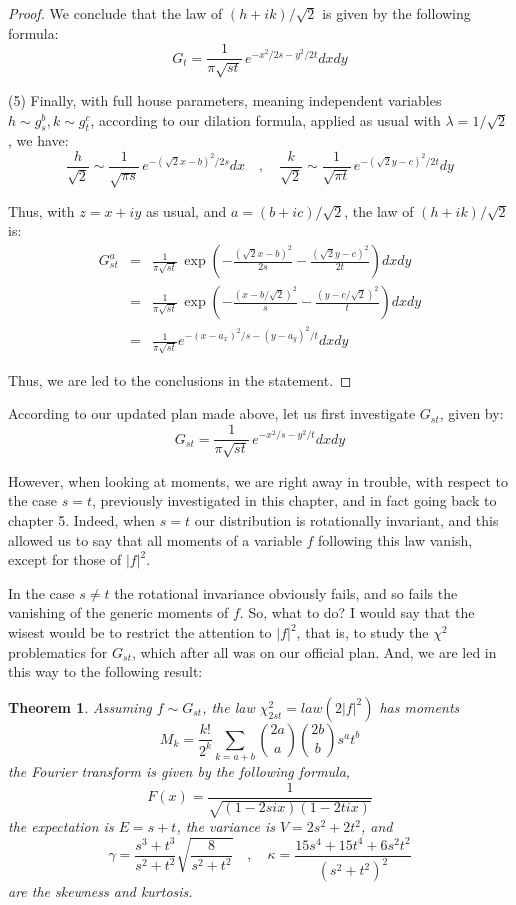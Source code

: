 \documentclass[12pt]{amsbook}
\newtheorem{theorem}{Theorem}[chapter]
\begin{document}
\begin{proof}
We conclude that the law of $(h+ik)/\sqrt{2}$ is given by the following formula:
$$G_t=\frac{1}{\pi\sqrt{st}}\,e^{-x^2/2s-y^2/2t}dxdy$$

(5) Finally, with full house parameters, meaning independent variables $h\sim g_s^b,k\sim g_t^c$, according to our dilation formula, applied as usual with $\lambda=1/\sqrt{2}$, we have:
$$\frac{h}{\sqrt{2}}\sim\frac{1}{\sqrt{\pi s}}\,e^{-(\sqrt{2}x-b)^2/2s}dx
\quad,\quad \frac{k}{\sqrt{2}}\sim\frac{1}{\sqrt{\pi t}}\,e^{-(\sqrt{2}y-c)^2/2t}dy$$

Thus, with $z=x+iy$ as usual, and $a=(b+ic)/\sqrt{2}$, the law of $(h+ik)/\sqrt{2}$ is:
\begin{eqnarray*}
G_{st}^a
&=&\frac{1}{\pi\sqrt{st}}\,\exp\left(-\frac{(\sqrt{2}x-b)^2}{2s}-\frac{(\sqrt{2}y-c)^2}{2t}\right)dxdy\\
&=&\frac{1}{\pi\sqrt{st}}\,\exp\left(-\frac{(x-b/\sqrt{2})^2}{s}-\frac{(y-c/\sqrt{2})^2}{t}\right)dxdy\\
&=&\frac{1}{\pi\sqrt{st}}e^{-(x-a_x)^2/s-(y-a_y)^2/t}dxdy
\end{eqnarray*}

Thus, we are led to the conclusions in the statement.
\end{proof}

According to our updated plan made above, let us first investigate $G_{st}$, given by:
$$G_{st}=\frac{1}{\pi\sqrt{st}}\,e^{-x^2/s-y^2/t}dxdy$$

However, when looking at moments, we are right away in trouble, with respect to the case $s=t$, previously investigated in this chapter, and in fact going back to chapter 5. Indeed, when $s=t$ our distribution is rotationally invariant, and this allowed us to say that all moments of a variable $f$ following this law vanish, except for those of $|f|^2$.

\bigskip

In the case $s\neq t$ the rotational invariance obviously fails, and so fails the vanishing of the generic moments of $f$. So, what to do? I would say that the wisest would be to restrict the attention to $|f|^2$, that is, to study the $\chi^2$ problematics for $G_{st}$, which after all was on our official plan. And, we are led in this way to the following result:

\begin{theorem}
Assuming $f\sim G_{st}$, the law $\chi_{2st}^2=law(2|f|^2)$ has moments
$$M_k=\frac{k!}{2^k}\sum_{k=a+b}\binom{2a}{a}\binom{2b}{b}s^at^b$$
the Fourier transform is given by the following formula,
$$F(x)=\frac{1}{\sqrt{(1-2six)(1-2tix)}}$$
the expectation is $E=s+t$, the variance is $V=2s^2+2t^2$, and
$$\gamma=\frac{s^3+t^3}{s^2+t^2}\sqrt{\frac{8}{s^2+t^2}}\quad,\quad
\kappa=\frac{15s^4+15t^4+6s^2t^2}{(s^2+t^2)^2}$$
are the skewness and kurtosis.
\end{theorem}
\end{document}

